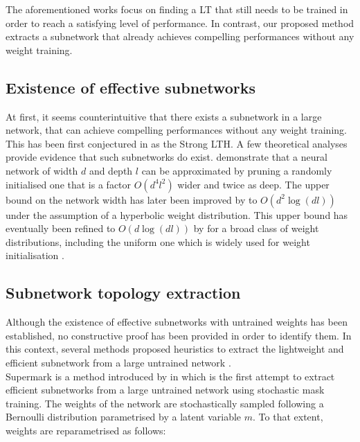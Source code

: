 The aforementioned works
\cite{DBLP:conf/iclr/FrankleC19,DBLP:conf/icml/FrankleD0C20,DBLP:conf/iclr/LiuSZHD19}
focus on finding a \acl{LT} that still needs to be trained in order to reach a
satisfying level of performance. In contrast, our proposed method extracts a
subnetwork that already achieves compelling performances without any weight
training.\\ 


\subsection{Existence of effective subnetworks} 
At first, it seems counterintuitive that there exists a subnetwork in a large
network, that can achieve compelling performances without any weight training.
This has been first conjectured in \cite{DBLP:conf/cvpr/RamanujanWKFR20} as the
Strong \acl{LTH}. A few theoretical analyses provide evidence that such
subnetworks do exist. \cite{DBLP:conf/icml/MalachYSS20} demonstrate that a
neural network of width $d$ and depth $l$ can be approximated by pruning a
randomly initialised one that is a factor $O(d^4l^2)$ wider and twice as deep.
The upper bound on the network width has later been improved by
\cite{DBLP:conf/nips/OrseauHR20} to $O(d^2\log(dl))$ under the assumption of a
hyperbolic weight distribution. This upper bound has eventually been refined to
$O(d\log(dl))$ by \cite{DBLP:conf/nips/PensiaRNVP20} for a broad class of weight
distributions, including the uniform one which is widely used for weight
initialisation \cite{DBLP:conf/iccv/HeZRS15}.\\

\subsection{Subnetwork topology extraction}\label{sec:chap2:subnetwork_topology_extraction}
Although the existence of effective subnetworks with untrained weights has been
established, no constructive proof has been provided in order to identify them.
In this context, several methods proposed heuristics to extract the lightweight
and efficient subnetwork from a large untrained network
\cite{DBLP:conf/nips/ZhouLLY19,DBLP:conf/cvpr/RamanujanWKFR20}.\\

Supermark is a method introduced by \citeauthor{DBLP:conf/nips/ZhouLLY19} in
\cite{DBLP:conf/nips/ZhouLLY19} which is the first attempt to extract efficient
subnetworks from a large untrained network using stochastic mask training. The
weights of the network are stochastically sampled following a Bernoulli
distribution parametrised by a latent variable $m$. To that extent, weights are
reparametrised as follows:\\

